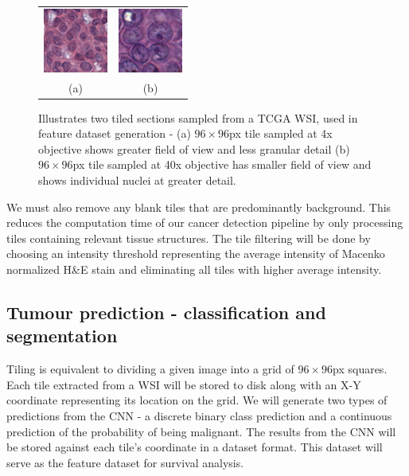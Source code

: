 \documentclass{l4proj}
\begin{document}
\begin{figure}[H]
\centering
\begin{tabular}{cc}
 \includegraphics[width=80px]{images/45_117.png}&
 \includegraphics[width=80px]{images/119_239.png}\\
 (a)&(b)\\
\end{tabular}
\caption{Illustrates two tiled sections sampled from a TCGA WSI, used in feature dataset generation - (a) \(96\times96\)px tile sampled at 4x objective shows greater field of view and less granular detail (b) \(96\times96\)px tile sampled at 40x objective has smaller field of view and shows individual nuclei at greater detail.}
\label{fig:downsample-example}
\end{figure}

We must also remove any blank tiles that are predominantly background. This reduces the computation time of our cancer detection pipeline by only processing tiles containing relevant tissue structures. The tile filtering will be done by choosing an intensity threshold representing the average intensity of Macenko normalized H\&E stain and eliminating all tiles with higher average intensity. 

\subsection{Tumour prediction - classification and segmentation} \label{sec:classication-design}
Tiling is equivalent to dividing a given image into a grid of \(96 \times 96\)px squares. Each tile extracted from a WSI will be stored to disk along with an X-Y coordinate representing its location on the grid. We will generate two types of predictions from the CNN - a discrete binary class prediction and a continuous prediction of the probability of being malignant. The results from the CNN will be stored against each tile's coordinate in a dataset format. This dataset will serve as the feature dataset for survival analysis. 
\end{document}
